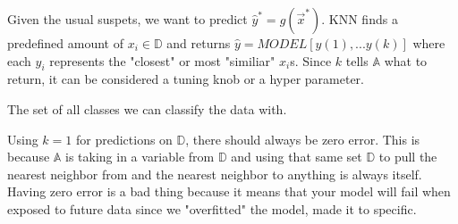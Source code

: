 \documentclass[12pt]{article}
\begin{document}

\begin{enumerate}


Given the usual suspets, we want to predict $\hat{y}^* = g(\vec{x}^*)$. KNN finds a predefined amount of $x_i\in\mathbb{D}$ and returns $\hat{y} = MODEL[y(1), ... y(k)]$ where each $y_i$ represents the "closest" or most "similiar" $x_i$s. Since $k$ tells $\mathbb{A}$ what to return, it can be considered a tuning knob or a hyper parameter.

The set of all classes we can classify the data with.

Using $k = 1$ for predictions on $\mathbb{D}$, there should always be zero error. This is because $\mathbb{A}$ is taking in a variable from $\mathbb{D}$ and using that same set $\mathbb{D}$ to pull the nearest neighbor from and the nearest neighbor to anything is always itself. Having zero error is a bad thing because it means that your model will fail when exposed to future data since we "overfitted" the model, made it to specific.

\end{enumerate}

\end{document}
